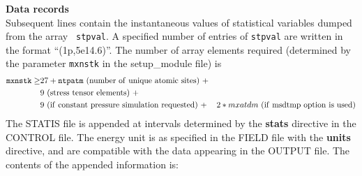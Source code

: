 {\bf Data records}\\ Subsequent lines contain the instantaneous
values of statistical variables dumped from the array {\tt
stpval}.  A specified number of entries of {\tt stpval} are
written in the format ``(1p,5e14.6)''.  The number of array
elements required (determined by the parameter {\tt mxnstk} in the
{\sc setup\_module} file) is
\begin{eqnarray}
{\tt mxnstk} \ge & 27  + {\tt ntpatm}~(\rm number~of~unique~atomic~sites) ~+ \nonumber \\
                 & 9~(\rm stress~tensor~elements) ~+ \nonumber \\
                 & 9~(\rm if~constant~pressure~simulation~requested) ~+ \nonumber
                 & 2*mxatdm~(\rm if~msdtmp~option~is~used) \nonumber
\end{eqnarray}
The STATIS file is appended at intervals determined by the {\bf
stats} directive in the CONTROL file.  The energy unit is as
specified in the FIELD file with the {\bf units} directive, and
are compatible with the data appearing in the OUTPUT file.  The
contents of the appended information is:
